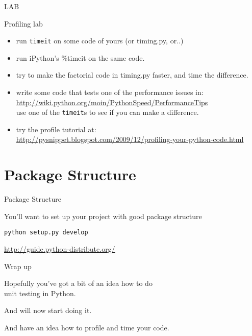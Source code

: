 \documentclass{beamer}
\begin{document}
\begin{frame}[fragile]{LAB}

{\Large Profiling lab}
\begin{itemize}
  \item run \verb|timeit| on some code of yours (or timing.py, or..)
  \item run iPython's \%timeit on the same code.
  \item try to make the factorial code in timing.py faster, and time the difference.
  \item write some code that tests one of the performance issues in:\\
        {\small \url{http://wiki.python.org/moin/PythonSpeed/PerformanceTips} }\\
        use one of the \verb|timeit|s to see if you can make a difference.
  \item try the profile tutorial at:\\
        {\small \url{http://pysnippet.blogspot.com/2009/12/profiling-your-python-code.html} }
\end{itemize}

\end{frame}

\section{Package Structure}

\begin{frame}[fragile]{Package Structure}

\vfill
{\Large You'll want to set up your project with good package structure}

\vfill
{\Large \verb|python setup.py develop|}

\vfill

\url{http://guide.python-distribute.org/}

\end{frame}


\begin{frame}[fragile]{Wrap up}

\vfill
{\Large Hopefully you've got a bit of an idea how to do\\[0.1in]
        unit testing in Python.}

\vfill
{\Large And will now start doing it.}

\vfill
{\Large And have an idea how to profile and time your code.}

\end{frame}
\end{document}
